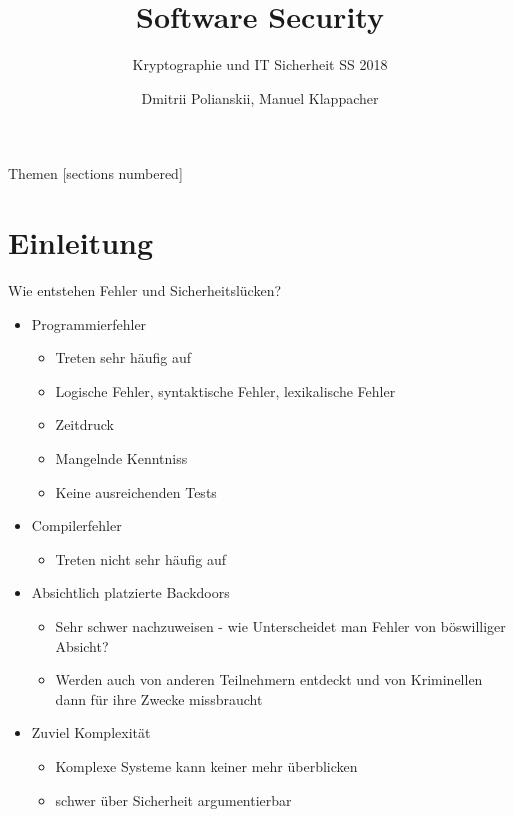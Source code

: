 \documentclass[10pt]{beamer}
\title{Software Security}
\subtitle{Kryptographie und IT Sicherheit SS 2018}
\date{}
\author{Dmitrii Polianskii, Manuel Klappacher}
\institute{Universit\"at Salzburg}
\begin{document}
\maketitle

\begin{frame}{Themen}
  [sections numbered]
  \tableofcontents[hideallsubsections]
\end{frame}


\section{Einleitung}

\begin{frame}[fragile]{Wie entstehen Fehler und Sicherheitsl\"ucken?}
  \begin{itemize}
    \item Programmierfehler
      \begin{itemize}
        \item Treten sehr h\"aufig auf
        \item Logische Fehler, syntaktische Fehler, lexikalische Fehler
        \item Zeitdruck
        \item Mangelnde Kenntniss
        \item Keine ausreichenden Tests
      \end{itemize}
    \item Compilerfehler
      \begin{itemize}
        \item Treten nicht sehr h\"aufig auf
      \end{itemize}
    \item Absichtlich platzierte Backdoors
      \begin{itemize}
        \item Sehr schwer nachzuweisen - wie Unterscheidet man Fehler von b\"oswilliger Absicht?
        \item Werden auch von anderen Teilnehmern entdeckt und von Kriminellen dann f\"ur ihre Zwecke missbraucht
      \end{itemize}
    \item Zuviel Komplexit\"at
      \begin{itemize}
        \item Komplexe Systeme kann keiner mehr \"uberblicken
        \item schwer \"uber Sicherheit argumentierbar
      \end{itemize}
  \end{itemize}
\end{frame}
\end{document}
